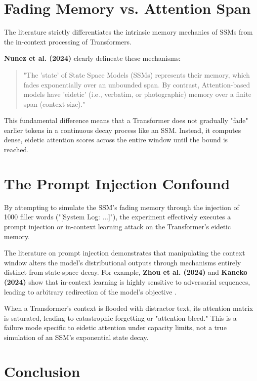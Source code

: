 \documentclass[12pt,a4paper]{article}
\begin{document}
\section{Fading Memory vs. Attention Span}

The literature strictly differentiates the intrinsic memory mechanics of SSMs from the in-context processing of Transformers.

\textbf{Nunez et al. (2024)} clearly delineate these mechanisms:
\begin{quote}
"The 'state' of State Space Models (SSMs) represents their memory, which fades exponentially over an unbounded span. By contrast, Attention-based models have 'eidetic' (i.e., verbatim, or photographic) memory over a finite span (context size)." \citep{nunez2024}
\end{quote}

This fundamental difference means that a Transformer does not gradually "fade" earlier tokens in a continuous decay process like an SSM. Instead, it computes dense, eidetic attention scores across the entire window until the bound is reached.

\section{The Prompt Injection Confound}

By attempting to simulate the SSM's fading memory through the injection of 1000 filler words ("[System Log: ...]"), the experiment effectively executes a prompt injection or in-context learning attack on the Transformer's eidetic memory.

The literature on prompt injection demonstrates that manipulating the context window alters the model's distributional outputs through mechanisms entirely distinct from state-space decay. For example, \textbf{Zhou et al. (2024)} and \textbf{Kaneko (2024)} show that in-context learning is highly sensitive to adversarial sequences, leading to arbitrary redirection of the model's objective \citep{zhou2024, kaneko2024}.

When a Transformer's context is flooded with distractor text, its attention matrix is saturated, leading to catastrophic forgetting or "attention bleed." This is a failure mode specific to eidetic attention under capacity limits, not a true simulation of an SSM's exponential state decay.

\section{Conclusion}
\end{document}
